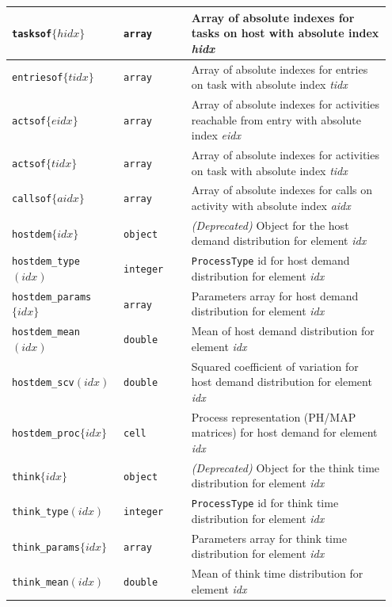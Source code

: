 \begin{MATLAB}
{\begin{longtable}{|p{0.28\linewidth}|p{0.17\linewidth}|p{0.50\linewidth}|}
\texttt{tasksof}$\{hidx\}$ & \texttt{array} & Array of absolute indexes for tasks on host with absolute index \textit{hidx} \\\hline
\texttt{entriesof}$\{tidx\}$ & \texttt{array} & Array of absolute indexes for entries on task with absolute index \textit{tidx} \\\hline
\texttt{actsof}$\{eidx\}$ & \texttt{array} & Array of absolute indexes for activities reachable from entry with absolute index \textit{eidx} \\\hline
\texttt{actsof}$\{tidx\}$ & \texttt{array} & Array of absolute indexes for activities on task with absolute index \textit{tidx} \\\hline
\texttt{callsof}$\{aidx\}$ & \texttt{array} & Array of absolute indexes for calls on activity with absolute index \textit{aidx} \\\hline
\texttt{hostdem}$\{idx\}$ & \texttt{object} & \textit{(Deprecated)} Object for the host demand distribution for element \textit{idx} \\\hline
\texttt{hostdem\_type}$(idx)$ & \texttt{integer} & \texttt{ProcessType} id for host demand distribution for element \textit{idx} \\\hline
\texttt{hostdem\_params}$\{idx\}$ & \texttt{array} & Parameters array for host demand distribution for element \textit{idx} \\\hline
\texttt{hostdem\_mean}$(idx)$ & \texttt{double} & Mean of host demand distribution for element \textit{idx} \\\hline
\texttt{hostdem\_scv}$(idx)$ & \texttt{double} & Squared coefficient of variation for host demand distribution for element \textit{idx} \\\hline
\texttt{hostdem\_proc}$\{idx\}$ & \texttt{cell} & Process representation (PH/MAP matrices) for host demand for element \textit{idx} \\\hline
\texttt{think}$\{idx\}$ & \texttt{object} & \textit{(Deprecated)} Object for the think time distribution for element \textit{idx} \\\hline
\texttt{think\_type}$(idx)$ & \texttt{integer} & \texttt{ProcessType} id for think time distribution for element \textit{idx} \\\hline
\texttt{think\_params}$\{idx\}$ & \texttt{array} & Parameters array for think time distribution for element \textit{idx} \\\hline
\texttt{think\_mean}$(idx)$ & \texttt{double} & Mean of think time distribution for element \textit{idx} \\\hline

\end{longtable}}
\end{MATLAB}
